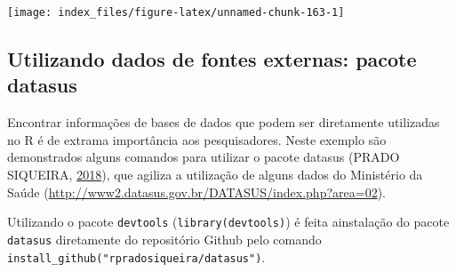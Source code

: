 \documentclass[12pt,brazil,oneside]{book}
\newenvironment{Shaded}{\begin{snugshade}}{\end{snugshade}}
\newcommand{\DataTypeTok}[1]{\textcolor[rgb]{0.13,0.29,0.53}{#1}}
\newcommand{\DecValTok}[1]{\textcolor[rgb]{0.00,0.00,0.81}{#1}}
\newcommand{\FloatTok}[1]{\textcolor[rgb]{0.00,0.00,0.81}{#1}}
\newcommand{\KeywordTok}[1]{\textcolor[rgb]{0.13,0.29,0.53}{\textbf{#1}}}
\newcommand{\NormalTok}[1]{#1}
\newcommand{\OperatorTok}[1]{\textcolor[rgb]{0.81,0.36,0.00}{\textbf{#1}}}
\newcommand{\StringTok}[1]{\textcolor[rgb]{0.31,0.60,0.02}{#1}}
\begin{document}
\begin{Shaded}
\end{Shaded}

\begin{center}\texttt{[image: index\_files/figure-latex/unnamed-chunk-163-1]} \end{center}

\hypertarget{utilizando-dados-de-fontes-externas-pacote-datasus}{%
\subsection{Utilizando dados de fontes externas: pacote datasus}\label{utilizando-dados-de-fontes-externas-pacote-datasus}}

Encontrar informações de bases de dados que podem ser diretamente utilizadas no R é de extrama importância aos pesquisadores. Neste exemplo são demonstrados alguns comandos para utilizar o pacote datasus (PRADO SIQUEIRA, \protect\hyperlink{ref-datasus}{2018}), que agiliza a utilização de alguns dados do Ministério da Saúde (\url{http://www2.datasus.gov.br/DATASUS/index.php?area=02}).

Utilizando o pacote \texttt{devtools} (\texttt{library(devtools)}) é feita ainstalação do pacote \texttt{datasus} diretamente do repositório Github pelo comando \texttt{install\_github("rpradosiqueira/datasus")}.
\end{document}
